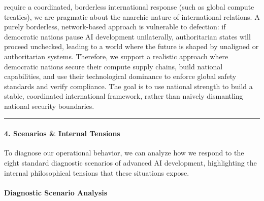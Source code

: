 \begin{itemize}
  require a coordinated, borderless international response (such as
  global compute treaties), we are pragmatic about the anarchic nature
  of international relations. A purely borderless, network-based
  approach is vulnerable to defection: if democratic nations pause AI
  development unilaterally, authoritarian states will proceed unchecked,
  leading to a world where the future is shaped by unaligned or
  authoritarian systems. Therefore, we support a realistic approach
  where democratic nations secure their compute supply chains, build
  national capabilities, and use their technological dominance to
  enforce global safety standards and verify compliance. The goal is to
  use national strength to build a stable, coordinated international
  framework, rather than naively dismantling national security
  boundaries.
\end{itemize}

\begin{center}\rule{0.5\linewidth}{0.5pt}\end{center}

\paragraph{4. Scenarios \& Internal
Tensions}\label{scenarios-internal-tensions-2}

To diagnose our operational behavior, we can analyze how we respond to
the eight standard diagnostic scenarios of advanced AI development,
highlighting the internal philosophical tensions that these situations
expose.

\paragraph{Diagnostic Scenario
Analysis}\label{diagnostic-scenario-analysis}

